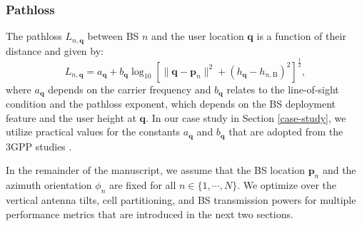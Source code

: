 

\subsubsection{Pathloss} The pathloss $L_{n,\bm{q}}$ between BS $n$ and the user location $\bm{q}$ is a function of their distance and given by:
\begin{equation} \label{eqn:Pathloss}
L_{n,\bm{q}} = a_{\bm{q}} + b_{\bm{q}} \log_{10}\left[\| \bm{q} - \bm{p}_n \|^2 + (h_{\bm{q}} -h_{n,\mathrm{B}})^2 \right]^{\frac{1}{2}},
\end{equation}
where $a_{\bm{q}}$ depends on the carrier frequency and $b_{\bm{q}}$ relates to the line-of-sight condition and the pathloss exponent, which depends on the BS deployment feature and the user height at $\bm{q}$. In our case study in Section \ref{case-study}, we utilize practical values for the constants $a_{\bm{q}}$ and $b_{\bm{q}}$ that are adopted from the 3GPP studies \cite{3GPP36777,3GPP38901}.

In the remainder of the manuscript, we assume that the BS location $\bm{p}_n$ and the azimuth orientation $\phi_n$ are fixed for all $n \in \{1, \cdots, N\}$. We optimize over the vertical antenna tilts, cell partitioning, and BS transmission powers for multiple performance metrics that are introduced in the next two sections.